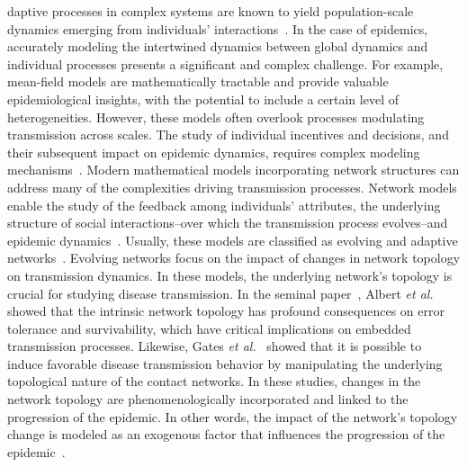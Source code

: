 \documentclass[9pt,twocolumn,twoside]{pnas-new}
\begin{document}
daptive processes in complex systems are known to yield population-scale dynamics emerging from individuals' interactions~\cite{Simon03}. In the case of epidemics, accurately modeling the intertwined dynamics between global dynamics and individual processes presents a significant and complex challenge. For example, mean-field models are mathematically tractable and provide valuable epidemiological insights, with the potential to include a certain level of heterogeneities. However, these models often overlook processes modulating transmission across scales. The study of individual incentives and decisions, and their subsequent impact on epidemic dynamics, requires complex modeling mechanisms~\cite{Traulsen23}.
%
Modern mathematical models incorporating network structures can address many of the complexities driving transmission processes.
%
Network models enable the study of the feedback among individuals' attributes, the underlying structure of social interactions--over which the transmission process evolves--and epidemic dynamics~\cite{Keeling2005, Danon2011, Kiss17}.
%
Usually, these models are classified as evolving and adaptive networks~\cite{Guo13}. Evolving networks focus on the impact of changes in network topology on transmission dynamics. In these models, the underlying network's topology is crucial for studying disease transmission.
%
In the seminal paper~\cite{albert2000error}, Albert {\it et al.} showed that the intrinsic network topology has profound consequences on error tolerance and survivability, which have critical implications on embedded transmission processes. Likewise, Gates {\it et al.}~\cite{GATES201511} showed that it is possible to induce favorable disease transmission behavior by manipulating the underlying topological nature of the contact networks.
%
%
In these studies, changes in the network topology are phenomenologically incorporated and linked to the progression of the epidemic. In other words, the impact of the network's topology change is modeled as an exogenous factor that influences the progression of the epidemic~\cite{leventhal2015evolution,rocha2013bursts,vazquez2016rescue}.
\end{document}
